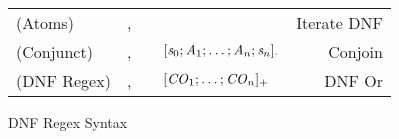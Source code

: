\begin{figure}
\begin{tabular}{l@{\ }l@{\ }c@{\ }l@{\ }r}

(Atoms)& \Atom{},\AtomAlt{} & \GEq{} & \StarOf{\DNFRegex{}} & Iterate DNF\\
(Conjunct)& \Conjunct{},\ConjunctAlt{} & \GEq{} &
$[\mathit{s}_0;\mathit{A}_1;\ldots;\mathit{A}_n;\mathit{s}_n]_{\cdot}$ & Conjoin\\
(DNF Regex)& \DNFRegex{},\DNFRegexAlt{} & \GEq{} & $[\mathit{CO}_1;\ldots;\mathit{CO}_n]_{+}$ & DNF Or\\
\end{tabular}
\caption{DNF Regex Syntax}
\label{fig:dnf-regex-syntax}
\end{figure}
